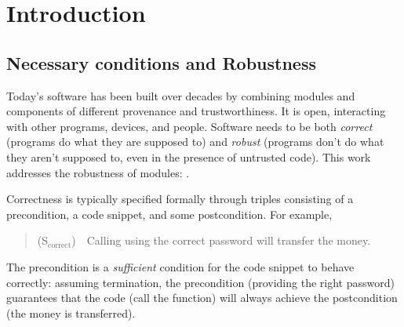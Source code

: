 \section{Introduction}
\label{s:intro}

\subsection{Necessary conditions and Robustness} 
Today's   software has been built 
over decades by combining modules and components of
different provenance and 
trustworthiness. It 
is open, interacting with other programs, devices, and people.
{Software needs} to be both  {\emph{correct}} ({programs do what they are supposed to}) and  %
{\emph{robust}} ({programs don't do what they aren't supposed to, even in the presence of untrusted code}). %
 {This work  addresses the robustness of modules: .}

 {Correctness is} typically specified formally 
 through  triples consisting of a  precondition, a code snippet, and some
 postcondition. 
 For example, 
 \begin{quote}
(S$_{\text{correct}}$)\ \ Calling  using the correct password will transfer the money.
\end{quote}
The precondition is a \emph{sufficient} condition for the {code snippet to behave correctly}: 
assuming termination, the precondition (\eg providing the right 
password) guarantees that
the code (\eg call the  function)
will always achieve the postcondition (the money is transferred).


    \vspace{.03in}
 
